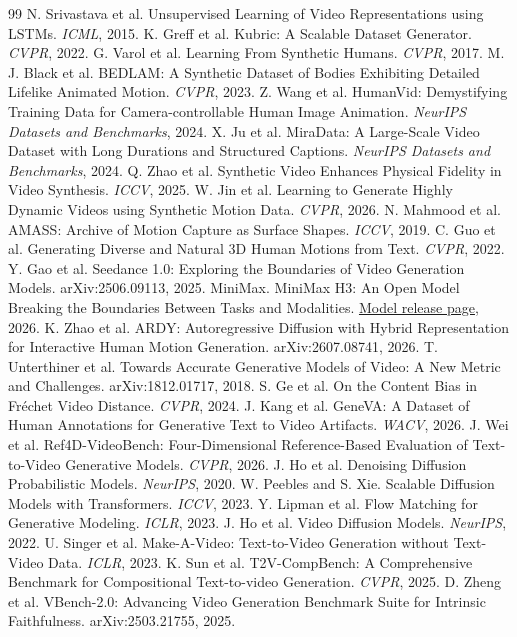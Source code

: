 \documentclass[11pt]{article}
\begin{document}
\balance
\begin{thebibliography}{99}\footnotesize
\setlength{\itemsep}{0pt}
\setlength{\parskip}{0pt}
 N. Srivastava et al. Unsupervised Learning of Video Representations using LSTMs. \emph{ICML}, 2015.
 K. Greff et al. Kubric: A Scalable Dataset Generator. \emph{CVPR}, 2022.
 G. Varol et al. Learning From Synthetic Humans. \emph{CVPR}, 2017.
 M. J. Black et al. BEDLAM: A Synthetic Dataset of Bodies Exhibiting Detailed Lifelike Animated Motion. \emph{CVPR}, 2023.
 Z. Wang et al. HumanVid: Demystifying Training Data for Camera-controllable Human Image Animation. \emph{NeurIPS Datasets and Benchmarks}, 2024.
 X. Ju et al. MiraData: A Large-Scale Video Dataset with Long Durations and Structured Captions. \emph{NeurIPS Datasets and Benchmarks}, 2024.
 Q. Zhao et al. Synthetic Video Enhances Physical Fidelity in Video Synthesis. \emph{ICCV}, 2025.
 W. Jin et al. Learning to Generate Highly Dynamic Videos using Synthetic Motion Data. \emph{CVPR}, 2026.
 N. Mahmood et al. AMASS: Archive of Motion Capture as Surface Shapes. \emph{ICCV}, 2019.
 C. Guo et al. Generating Diverse and Natural 3D Human Motions from Text. \emph{CVPR}, 2022.
 Y. Gao et al. Seedance 1.0: Exploring the Boundaries of Video Generation Models. arXiv:2506.09113, 2025.
 MiniMax. MiniMax H3: An Open Model Breaking the Boundaries Between Tasks and Modalities.
\href{https://www.minimax.io/blog/minimax-h3}{Model release page}, 2026.
 K. Zhao et al. ARDY: Autoregressive Diffusion with Hybrid Representation for Interactive Human Motion Generation. arXiv:2607.08741, 2026.
 T. Unterthiner et al. Towards Accurate Generative Models of Video: A New Metric and Challenges. arXiv:1812.01717, 2018.
 S. Ge et al. On the Content Bias in Fr\'echet Video Distance. \emph{CVPR}, 2024.
 J. Kang et al. GeneVA: A Dataset of Human Annotations for Generative Text to Video Artifacts. \emph{WACV}, 2026.
 J. Wei et al. Ref4D-VideoBench: Four-Dimensional Reference-Based Evaluation of Text-to-Video Generative Models. \emph{CVPR}, 2026.
 J. Ho et al. Denoising Diffusion Probabilistic Models. \emph{NeurIPS}, 2020.
 W. Peebles and S. Xie. Scalable Diffusion Models with Transformers. \emph{ICCV}, 2023.
 Y. Lipman et al. Flow Matching for Generative Modeling. \emph{ICLR}, 2023.
 J. Ho et al. Video Diffusion Models. \emph{NeurIPS}, 2022.
 U. Singer et al. Make-A-Video: Text-to-Video Generation without Text-Video Data. \emph{ICLR}, 2023.
 K. Sun et al. T2V-CompBench: A Comprehensive Benchmark for Compositional Text-to-video Generation. \emph{CVPR}, 2025.
 D. Zheng et al. VBench-2.0: Advancing Video Generation Benchmark Suite for Intrinsic Faithfulness. arXiv:2503.21755, 2025.
\end{thebibliography}
\end{document}
